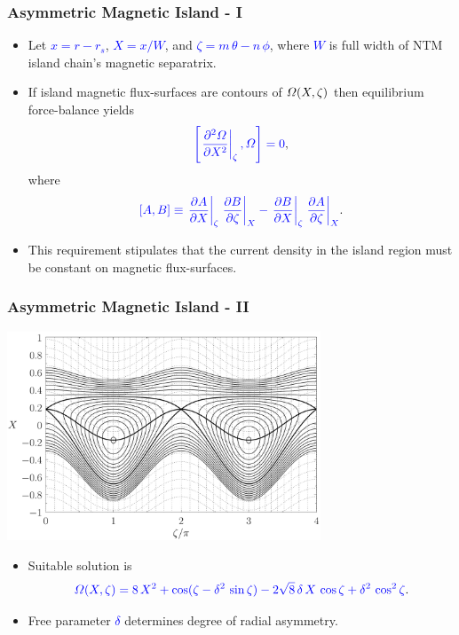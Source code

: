 \documentclass{beamer}
\begin{document}
\begin{frame}
\frametitle{Asymmetric Magnetic Island - I}
 
\begin{itemize}
\item Let \textcolor{blue}{$x=r-r_s$}, \textcolor{blue}{$X=x/W$}, and \textcolor{blue}{$\zeta=m\,\theta-n\,\phi$}, where \textcolor{blue}{$W$} is full width  of NTM island chain's magnetic separatrix. 

\item If island magnetic flux-surfaces are contours of \textcolor{blue}{${\mit\Omega}(X,\zeta)$} then equilibrium force-balance yields
$$
\textcolor{blue}{\left[\left.\frac{\partial^2{\mit\Omega}}{\partial X^2}\right|_\zeta,{\mit\Omega}\right]=0},
$$
where
$$
\textcolor{blue}{[A,B] \equiv \left.\frac{\partial A}{\partial X}\right|_\zeta \left.\frac{\partial B}{\partial\zeta}\right|_X- \left.\frac{\partial B}{\partial X}\right|_\zeta \left.\frac{\partial A}{\partial\zeta}\right|_X}.
$$
\item This requirement stipulates that the current density in the island region must be constant on magnetic flux-surfaces. 

\end{itemize}
\end{frame}

\begin{frame}
\frametitle{Asymmetric Magnetic Island - II}
 
\begin{center}
\includegraphics[width=0.7\textwidth]{../Fig3.pdf}
\end{center} 

\begin{itemize}
\item Suitable solution is 
$$
\textcolor{blue}{{\mit\Omega}(X,\zeta) = 8\,X^2 + \cos(\zeta-\delta^2\,\sin\zeta) - 2\sqrt{8}\,\delta\,X\,\cos\zeta+\delta^2\,\cos^2\zeta}. 
$$
\item Free parameter \textcolor{blue}{$\delta$} determines degree of radial asymmetry. 

\end{itemize}
\end{frame}
\end{document}
